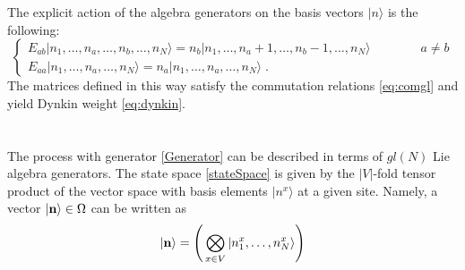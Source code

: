 \documentclass[10pt]{article}
\numberwithin{equation}{section}
\numberwithin{equation}{subsection}
\newcommand{\dt}{\;.}
\newcommand{\twoj}{\nu}
\begin{document}
The explicit action of the algebra generators on the basis  vectors $|n\rangle$ is the following:
\begin{equation}\label{actionE}
	\begin{cases}
		E_{ab}|n_{1},\ldots,n_{a},\ldots,n_{b},\ldots,n_{N}\rangle =n_{b}|n_{1},\ldots,n_{a}+1,\ldots,n_{b}-1,\ldots,n_{N}\rangle\qquad\qquad a\neq b\\[0.1cm]
		E_{aa}|n_{1},\ldots,n_{a},\ldots,n_{N}\rangle = n_{a} |n_{1},\ldots,n_{a},\ldots,n_{N}\rangle\dt
	\end{cases}
\end{equation}  
The matrices defined in this way satisfy the commutation relations \eqref{eq:comgl} and yield Dynkin weight \eqref{eq:dynkin}. \\
\\ \\
The process with generator \eqref{Generator} can be described in terms of $gl(N)$ Lie algebra generators. The state space \eqref{stateSpace} is given by the $|V|$-fold tensor product of the vector space with basis elements $|n^x\rangle$ at a given site. Namely,
a vector $|{\bf n}\rangle \in \Omega$ can be written as
\begin{equation}
|{\bf n}\rangle=\left(\,\bigotimes_{x\in V}	|n_{1}^{x},\ldots,n_{N}^{x}\rangle\right)
\end{equation}
\end{document}
